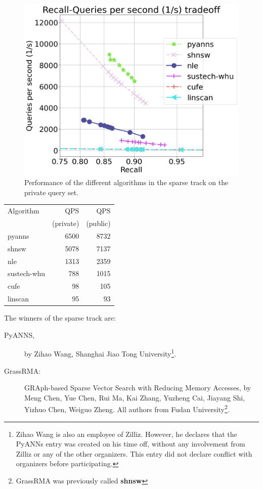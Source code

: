 \begin{figure}
    \centering
\includegraphics[width=.9\linewidth]{fig/sparse-full.png}
    \caption{Performance of the different algorithms in the sparse track on the private query set.}
    \label{fig:sparse_results}
\end{figure}

\begin{table}
\centering
\begin{tabular}{lrr}
\hline
Algorithm & QPS       & QPS \\
          & (private) & (public) \\
\hline
pyanns & 6500 & 8732 \\
shnsw & 5078 & 7137 \\
nle & 1313 & 2359 \\
sustech-whu & 788 & 1015\\ 
cufe & 98 & 105 \\
linscan & 95 & 93 \\
\hline
\end{tabular}
\label{tab:sparse}
\end{table}

\fi 

\ifarxiv
The winners of the sparse track are:
\begin{description}
   \item[PyANNS,]by Zihao Wang, Shanghai Jiao Tong University\footnote{Zihao Wang is also an employee of Zilliz.
   However, he declares that the PyANNs entry was created on his time off, without any involvement from Zilliz or any of the other organizers.
   This entry did not declare conflict with organizers before participating.}.
   \item[GrassRMA:] GRAph-based Sparse Vector Search with Reducing Memory Accesses, by Meng Chen, Yue Chen, Rui Ma, Kai Zhang, Yuzheng Cai, Jiayang Shi, Yizhuo Chen, Weiguo Zheng. All authors from Fudan University\footnote{GrassRMA was previously called \textbf{shnsw}}.
\end{description}
\fi

